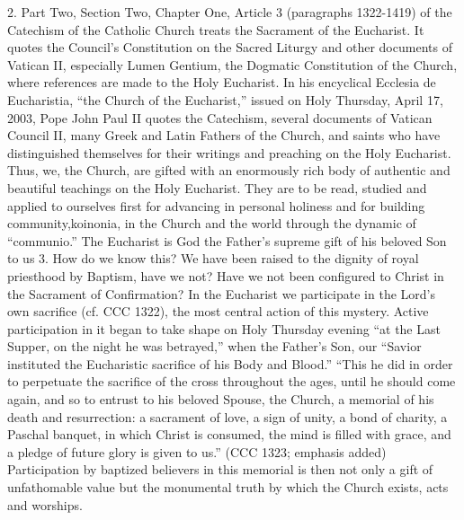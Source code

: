 \documentclass[oneside]{book}
\begin{document}
2. Part Two, Section Two, Chapter One, Article 3 (paragraphs 1322-1419) of the
Catechism of the Catholic Church treats the Sacrament of the Eucharist. It
quotes the Council's Constitution on the Sacred Liturgy and other documents of
Vatican II, especially Lumen Gentium, the Dogmatic Constitution of the Church,
where references are made to the Holy Eucharist. In his encyclical Ecclesia de
Eucharistia, ``the Church of the Eucharist,'' issued on Holy Thursday, April 17,
2003, Pope John Paul II quotes the Catechism, several documents of Vatican
Council II, many Greek and Latin Fathers of the Church, and saints who have
distinguished themselves for their writings and preaching on the Holy
Eucharist. Thus, we, the Church, are gifted with an enormously rich body of
authentic and beautiful teachings on the Holy Eucharist. They are to be read,
studied and applied to ourselves first for advancing in personal holiness and
for building community,koinonia, in the Church and the world through the dynamic
of ``communio.''
The Eucharist is God the Father's supreme gift of his beloved Son to us
3. How do we know this? We have been raised to the dignity of royal priesthood
by Baptism, have we not? Have we not been configured to Christ in the Sacrament
of Confirmation? In the Eucharist we participate in the Lord's own sacrifice
(cf. CCC 1322), the most central action of this mystery. Active participation in
it began to take shape on Holy Thursday evening ``at the Last Supper, on the
night he was betrayed,'' when the Father's Son, our ``Savior instituted the
Eucharistic sacrifice of his Body and Blood.'' ``This he did in order to
perpetuate the sacrifice of the cross throughout the ages, until he should come
again, and so to entrust to his beloved Spouse, the Church, a memorial of his
death and resurrection: a sacrament of love, a sign of unity, a bond of charity,
a Paschal banquet, in which Christ is consumed, the mind is filled with grace,
and a pledge of future glory is given to us.'' (CCC 1323; emphasis added)
Participation by baptized believers in this memorial is then not only a gift of
unfathomable value but the monumental truth by which the Church exists, acts and
worships.
\end{document}
